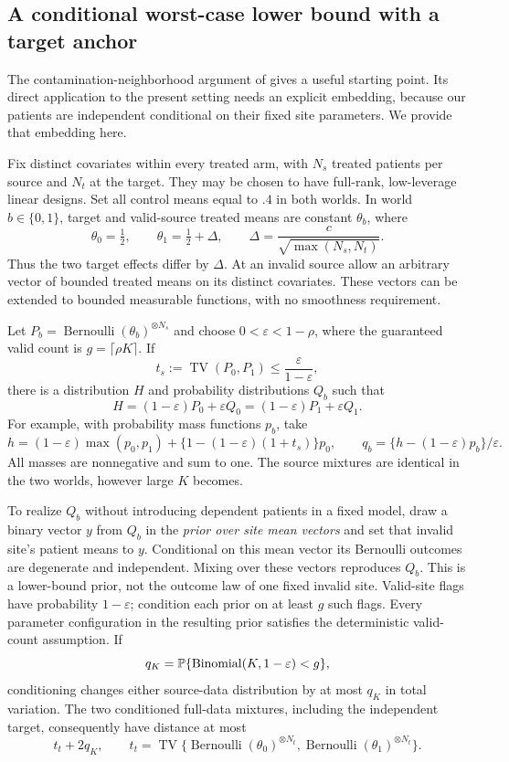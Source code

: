 \subsection{A conditional worst-case lower bound with a target anchor}

The contamination-neighborhood argument of \citet{chen2016} gives a useful
starting point. Its direct application to the present setting needs an
explicit embedding, because our patients are independent conditional on their
fixed site parameters. We provide that embedding here.

Fix distinct covariates within every treated arm, with $N_s$ treated patients
per source and $N_t$ at the target. They may be chosen to have full-rank,
low-leverage linear designs. Set all control means equal to $.4$ in both
worlds. In world $b\in\{0,1\}$, target and valid-source treated means are
constant $\theta_b$, where
\[
 \theta_0=\tfrac12,\qquad \theta_1=\tfrac12+\Delta,\qquad
 \Delta=\frac{c}{\sqrt{\max(N_s,N_t)}}.
\]
Thus the two target effects differ by $\Delta$. At an invalid source allow
an arbitrary vector of bounded treated means on its distinct covariates.
These vectors can be extended to bounded measurable functions, with no
smoothness requirement.

Let $P_b=\operatorname{Bernoulli}(\theta_b)^{\otimes N_s}$ and choose
$0<\varepsilon<1-\rho$, where the guaranteed valid count is
$g=\lceil\rho K\rceil$. If
\[
 t_s:=\operatorname{TV}(P_0,P_1)\le\frac{\varepsilon}{1-\varepsilon},
\]
there is a distribution $H$ and probability distributions $Q_b$ such that
\[
 H=(1-\varepsilon)P_0+\varepsilon Q_0
  =(1-\varepsilon)P_1+\varepsilon Q_1.
\]
For example, with probability mass functions $p_b$, take
\[
 h=(1-\varepsilon)\max(p_0,p_1)
       +\{1-(1-\varepsilon)(1+t_s)\}p_0,
 \qquad q_b=\{h-(1-\varepsilon)p_b\}/\varepsilon.
\]
All masses are nonnegative and sum to one. The source mixtures are identical
in the two worlds, however large $K$ becomes.

To realize $Q_b$ without introducing dependent patients in a fixed model,
draw a binary vector $y$ from $Q_b$ in the \emph{prior over site mean vectors}
and set that invalid site's patient means to $y$. Conditional on this mean
vector its Bernoulli outcomes are degenerate and independent. Mixing over
these vectors reproduces $Q_b$. This is a lower-bound prior, not the
outcome law of one fixed invalid site. Valid-site flags have probability
$1-\varepsilon$; condition each prior on at least $g$ such flags. Every
parameter configuration in the resulting prior satisfies the deterministic
valid-count assumption. If
\[
 q_K=\mathbb P\{\operatorname{Binomial}(K,1-\varepsilon)<g\},
\]
conditioning changes either source-data distribution by at most $q_K$ in
total variation. The two conditioned full-data mixtures, including the
independent target, consequently have distance at most
\[
 t_t+2q_K,\qquad
 t_t=\operatorname{TV}\{\operatorname{Bernoulli}(\theta_0)^{\otimes N_t},
                        \operatorname{Bernoulli}(\theta_1)^{\otimes N_t}\}.
\]

